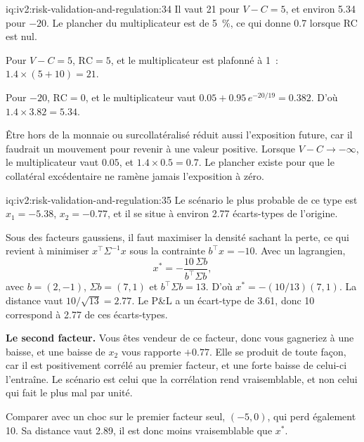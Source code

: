 \begin{solution}{iq:iv2:risk-validation-and-regulation:34}
Il vaut 21 pour $V - C = 5$, et environ 5.34 pour $-20$. Le plancher du multiplicateur est de 5~\%, ce qui donne 0.7 lorsque RC est nul.

Pour $V - C = 5$, $\mathrm{RC} = 5$, et le multiplicateur est plafonné à 1~: $1.4 \times (5 + 10) = 21$.

Pour $-20$, $\mathrm{RC} = 0$, et le multiplicateur vaut $0.05 + 0.95\,e^{-20/19} = 0.382$. D'où $1.4 \times 3.82 = 5.34$.

Être hors de la monnaie ou surcollatéralisé réduit aussi l'exposition future, car il faudrait un mouvement pour revenir à une valeur positive. Lorsque $V - C \to -\infty$, le multiplicateur vaut $0.05$, et $1.4 \times 0.5 = 0.7$. Le plancher existe pour que le collatéral excédentaire ne ramène jamais l'exposition à zéro.

\end{solution}

\begin{solution}{iq:iv2:risk-validation-and-regulation:35}
Le scénario le plus probable de ce type est $x_1 = -5.38$, $x_2 = -0.77$, et il se situe à environ 2.77 écarts-types de l'origine.

Sous des facteurs gaussiens, il faut maximiser la densité sachant la perte, ce qui revient à minimiser $x^\top\Sigma^{-1}x$ sous la contrainte $b^\top x = -10$. Avec un lagrangien,
\[
x^* = -\frac{10\,\Sigma b}{b^\top\Sigma b},
\]
avec $b = (2, -1)$, $\Sigma b = (7, 1)$ et $b^\top\Sigma b = 13$. D'où $x^* = -(10/13)(7, 1)$. La distance vaut $10/\sqrt{13} = 2.77$. Le P\&L a un écart-type de 3.61, donc 10 correspond à 2.77 de ces écarts-types.

\textbf{Le second facteur.} Vous êtes vendeur de ce facteur, donc vous gagneriez à une baisse, et une baisse de $x_2$ vous rapporte $+0.77$. Elle se produit de toute façon, car il est positivement corrélé au premier facteur, et une forte baisse de celui-ci l'entraîne. Le scénario est celui que la corrélation rend vraisemblable, et non celui qui fait le plus mal par unité.

Comparer avec un choc sur le premier facteur seul, $(-5, 0)$, qui perd également 10. Sa distance vaut 2.89, il est donc moins vraisemblable que $x^*$.

\end{solution}

